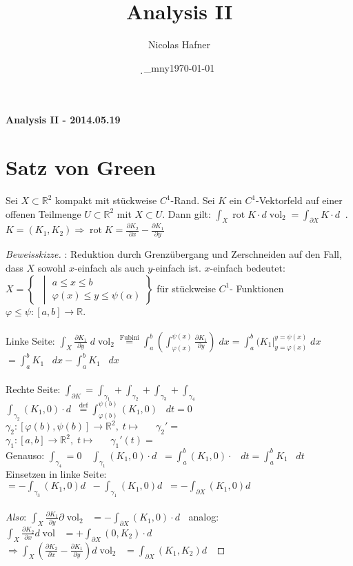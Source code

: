 \documentclass[12pt,a4paper,titlepage]{article}
\author{Nicolas Hafner}
\title{Analysis II}
\date{\d_mny\today}
\renewcommand{\d}{\partial}
\newcommand{\setR}{\mathbb{R}}
\newcommand{\vol}{\operatorname{vol}}
\newcommand{\rot}{\operatorname{rot}}
\newcommand{\twovec}[2]{\mathop{\left(\substack{#1 \\ #2}\right)}}
\begin{document}
	
\begin{center}{\bfseries\Huge Analysis II - 2014.05.19}\end{center}
\section*{Satz von Green}
Sei $X\subset\setR^2$ kompakt mit stückweise $C^1$-Rand. Sei $K$ ein $C^1$-Vektorfeld auf einer offenen Teilmenge $U\subset\setR^2$ mit $X\subset U$. Dann gilt: $\int_X\rot K\cdot d\vol_2=\int_{\d X}K\cdot d\twovec{x}{y}$. \\
$K=(K_1,K_2)\Rightarrow \rot K=\frac{\d K_2}{\d x}-\frac{\d K_1}{\d y}$

\begin{proof}[Beweisskizze]: Reduktion durch Grenzübergang und Zerschneiden auf den Fall, dass $X$ sowohl $x$-einfach als auch $y$-einfach ist. $x$-einfach bedeutet: $X=\left\{\twovec{x}{y}\middle|\substack{a\leq x\leq b \\ \varphi(x)\leq y\leq \psi(\alpha)}\right\}$ für stückweise $C^1$- Funktionen $\varphi\leq\psi:[a,b]\to\setR$. \\
  \\
  Linke Seite: $\int_X\frac{\d K_1}{\d y} \;d\vol_2\overset{\text{Fubini}}{=}\int_a^b(\int_{\varphi(x)}^{\psi(x)}\frac{\d K_1}{\d y}) \;dx = \int_a^b(\left. K_1\right|_{y=\varphi(x)}^{y=\psi(x)} \;dx$ \\
  $= \int_a^bK_1\twovec{x}{\psi(x)} \;dx-\int_a^bK_1\twovec{x}{\varphi(x)} \;dx$ \\
  \\
  Rechte Seite: $\int_{\d K}=\int_{\gamma_1}+\int_{\gamma_2}+\int_{\gamma_3}+\int_{\gamma_4}$ \quad $\int_{\gamma_2}(K_1,0)\cdot d\twovec{x}{y}\overset{\text{def}}{=}\int_{\varphi(b)}^{\psi(b)}(K_1,0)\twovec{0}{1} \;dt=0$ \\
  $\gamma_2:[\varphi(b),\psi(b)]\to\setR^2,\;t\mapsto\twovec{b}{t} \quad \gamma_2'=\twovec{0}{1}$ \\
  $\gamma_1:[a,b]\to\setR^2,\;t\mapsto\twovec{t}{\varphi(t)} \quad \gamma_1'(t)=\twovec{1}{\varphi'(t)}$ \\
  Genauso: $\int_{\gamma_4}=0 \quad \int_{\gamma_1}(K_1,0)\cdot d\twovec{x}{y}=\int_a^b(K_1,0)\cdot\twovec{1}{\varphi'(t)} \;dt = \int_a^bK_1\twovec{t}{\varphi(t)} \;dt$ \\
  Einsetzen in linke Seite: $=-\int_{\gamma_3}(K_1,0)d\twovec{x}{y}-\int_{\gamma_1}(K_1,0)d\twovec{x}{y} = -\int_{\d X}(K_1,0)d\twovec{x}{y}$ \\
  \\
  \textit{Also}: $\int_X\frac{\d K_1}{\d y}\d\vol_2\twovec{x}{y}=-\int_{\d X}(K_1,0)\cdot d\twovec{x}{y}$ analog: $\int_X\frac{\d K_2}{\d x}d\vol\twovec{x}{y}=+\int_{\d X}(0,K_2)\cdot d\twovec{x}{y}$ \\
  $\Rightarrow \int_X(\frac{\d K_2}{\d x}-\frac{\d K_1}{\d y})d \vol_2\twovec{x}{y}=\int_{\d X}(K_1,K_2)d\twovec{x}{y}$
\end{proof}
\end{document}
